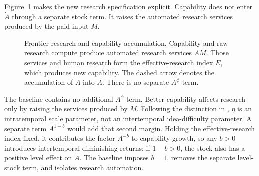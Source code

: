Figure~\ref{fig:axm-research-flow} makes the new research specification
explicit. Capability does not enter \(\dot A\) through a separate stock term.
It raises the automated research services produced by the paid input \(M\).

\begin{figure}[H]
 \centering
 \caption{Frontier research and capability accumulation. Capability and raw
 research compute produce automated research services \(AM\). Those services
 and human research form the effective-research index \(E\), which produces
 new capability. The dashed arrow denotes the accumulation of \(\dot A\) into
 \(A\). There is no separate \(A^\phi\) term.}
 \label{fig:axm-research-flow}
\end{figure}

The baseline contains no additional \(A^\phi\) term. Better capability affects
research only by raising the services produced by \(M\). Following the distinction
in \citet{jones1995,davidsonetal2026}, \(\eta\) is an intratemporal scale parameter,
not an intertemporal idea-difficulty parameter. A separate term \(A^{1-b}\) would
add that second margin. Holding the effective-research index fixed, it contributes
the factor \(A^{-b}\) to capability growth, so any \(b>0\) introduces
intertemporal diminishing returns; if \(1-b>0\), the stock also has a positive
level effect on \(\dot A\). The baseline imposes \(b=1\), removes the separate
level-stock term, and isolates research automation.

